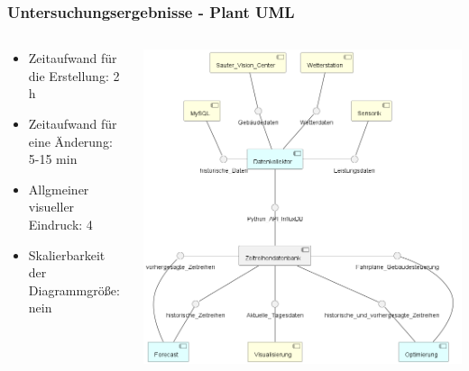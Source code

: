 \documentclass[xcolor=dvipsnames]{beamer}
\begin{document}
\begin{frame}
	\frametitle{Untersuchungsergebnisse - Plant UML}
	\begin{columns}
		
		\begin{column}{0.35\textwidth}
			\begin{block}{}
				\begin{itemize}
					\item Zeitaufwand für die Erstellung: 2 h
					\item Zeitaufwand für eine Änderung: 5-15 min
					\item Allgmeiner visueller Eindruck: 4
					\item Skalierbarkeit der Diagrammgröße: nein
					
				\end{itemize}
				
			\end{block}
		\end{column}

		
		\begin{column}{0.75\textwidth}
			\begin{minipage}{\textwidth}
				\includegraphics[scale=0.3]{../Diagramms/PlantUML/overview.PNG}
			\end{minipage}
		\end{column}
		
	\end{columns}
\end{frame}
\end{document}

